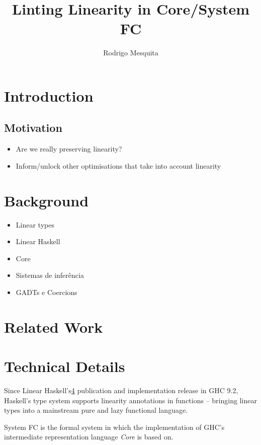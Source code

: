 \documentclass[a4paper, draft]{article}
\title{Linting Linearity in Core/System FC}
\author{Rodrigo Mesquita}
\begin{document}
\maketitle

\section{Introduction}

\subsection{Motivation}

\begin{itemize}
    \item Are we really preserving linearity?
    \item Inform/unlock other optimisations that take into account linearity
\end{itemize}


\section{Background}

\begin{itemize}
    \item Linear types
    \item Linear Haskell
    \item Core
    \item Sistemas de inferência
    \item GADTs e Coercions
\end{itemize}

\section{Related Work}


\section{Technical Details}

Since Linear Haskell's\ref{}
publication and implementation release in GHC 9.2, Haskell's type system
supports linearity annotations in functions -- bringing linear types into a
mainstream pure and lazy functional language.

System FC is the formal system in which the implementation of GHC's intermediate
representation language \emph{Core} is based on.
\end{document}
